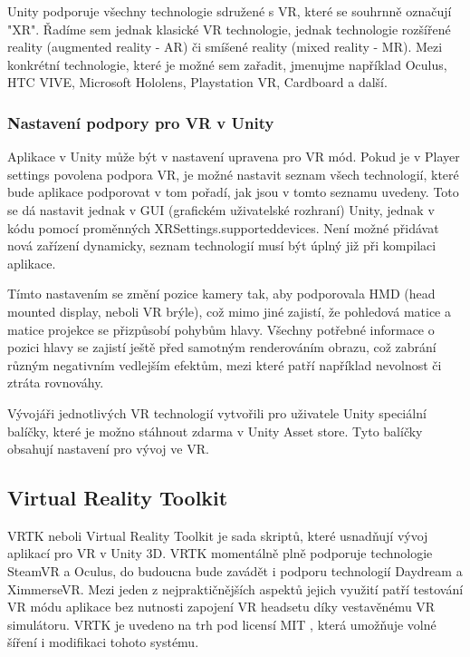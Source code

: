 \documentclass[thesis=B,czech]{FITthesis}[2012/06/26]
\begin{document}
		Unity podporuje všechny technologie sdružené s VR, které se souhrnně označují "XR". Řadíme sem jednak klasické VR technologie, jednak technologie rozšířené reality (augmented reality - AR) či smíšené reality (mixed reality - MR). Mezi konkrétní technologie, které je možné sem zařadit, jmenujme například Oculus, HTC VIVE, Microsoft Hololens, Playstation VR, Cardboard a další.\cite{UnityVR}
		
		\subsubsection{Nastavení podpory pro VR v Unity}
		
		Aplikace v Unity může být v nastavení upravena pro VR mód. Pokud je v Player settings povolena podpora VR, je možné nastavit seznam všech technologií, které bude aplikace podporovat v tom pořadí, jak jsou v tomto seznamu uvedeny. Toto se dá nastavit jednak v GUI (grafickém uživatelské rozhraní) Unity, jednak v kódu pomocí proměnných XRSettings.supporteddevices. Není možné přidávat nová zařízení dynamicky, seznam technologií musí být úplný již při kompilaci aplikace.

Tímto nastavením se změní pozice kamery tak, aby podporovala HMD (head mounted display, neboli VR brýle), což mimo jiné zajistí, že pohledová matice a matice projekce se přizpůsobí pohybům hlavy. Všechny potřebné informace o pozici hlavy se zajistí ještě před samotným renderováním obrazu, což zabrání různým negativním vedlejším efektům, mezi které patří například nevolnost či ztráta rovnováhy.

Vývojáři jednotlivých VR technologií vytvořili pro uživatele Unity speciální balíčky, které je možno stáhnout zdarma v Unity Asset store. Tyto balíčky obsahují nastavení pro vývoj ve VR.\cite{UnityVR}

		\subsection{Virtual Reality Toolkit}
		
		VRTK neboli Virtual Reality Toolkit je sada skriptů, které usnadňují vývoj aplikací pro VR v Unity 3D. VRTK momentálně plně podporuje technologie SteamVR a Oculus, do budoucna bude zavádět i podporu technologií Daydream a XimmerseVR. Mezi jeden z nejpraktičnějších aspektů jejich využití patří testování VR módu aplikace bez nutnosti zapojení VR headsetu díky vestavěnému VR simulátoru. VRTK je uvedeno na trh pod licensí MIT \cite{VRTKlic}, která umožňuje volné šíření i modifikaci tohoto systému.
		
\end{document}
